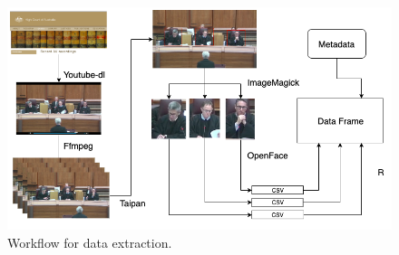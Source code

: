 \documentclass{monashthesis}
\begin{document}
\begin{figure}
\hypertarget{fig:workflow}{%
\centering
\includegraphics{figures/workflow.png}
\caption{Workflow for data extraction.}\label{fig:workflow}
}
\end{figure}

\printbibliography[heading=bibintoc]
\end{document}
